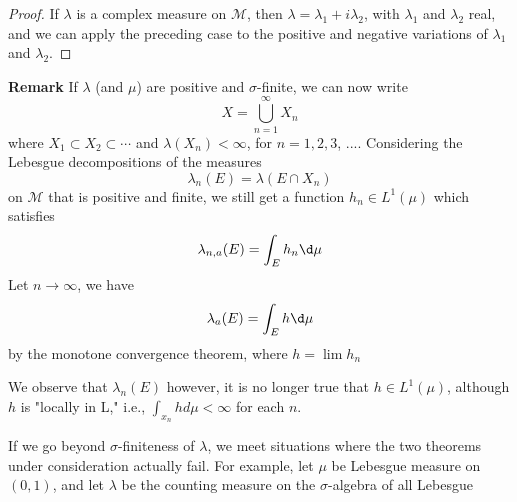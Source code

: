 \documentclass[12pt, a4paper, oneside]{book}
\begin{document}
\begin{theorem}
\begin{proof}
        If $\lambda$ is a complex measure on $\mathcal{M}$, then $\lambda=\lambda_1+i \lambda_2$, with $\lambda_1$ and $\lambda_2$ real, and we can apply the preceding case to the positive and negative variations of $\lambda_1$ and $\lambda_2$.
    \end{proof}

    \textbf{Remark} If $\lambda$ (and $\mu$) are positive and $\sigma$-finite, we can now write
    $$
        X=\bigcup_{n=1}^\infty X_n
    $$
    where $X_1 \subset X_2 \subset \cdots$ and $\lambda\left(X_n\right)<\infty$, for $n=1,2,3$, ....
    Considering the Lebesgue decompositions of the measures
    $$\lambda_n(E) = \lambda\left(E \cap X_n\right)$$
    on $\mathcal{M}$ that is positive and finite, we still get a function $h_n\in L^1 (\mu)$ which satisfies
    $$\lambda_{n,a}(E) = \int_{E} h_n \d \mu$$
    Let $n\to \infty$, we have
    $$\lambda_a (E) =  \int_{E} h \d \mu$$
    by the monotone convergence theorem, where $h=\lim h_n$

    We observe that $\lambda_n(E)$
    however, it is no longer true that $h \in L^1(\mu)$, although $h$ is "locally in L," i.e., $\int_{x_n} h d \mu<\infty$ for each $n$.

    If we go beyond $\sigma$-finiteness of $\lambda$, we meet situations where the two theorems under consideration actually fail. For example, let $\mu$ be Lebesgue measure on $(0,1)$, and let $\lambda$ be the counting measure on the $\sigma$-algebra of all Lebesgue
\end{theorem}
\end{document}
